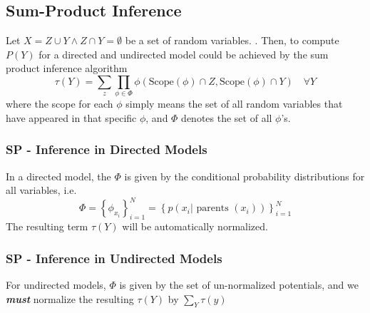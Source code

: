 \documentclass[11pt]{article}
\begin{document}
\subsection{Sum-Product Inference}
Let $X = Z \cup Y \wedge Z \cap Y = \emptyset$ be a set of random variables. . Then, to compute $P(Y)$ for a directed and undirected  model could be achieved by the sum product inference algorithm
\begin{equation*}
    \tau(Y)=\sum_{z}\prod_{\phi \in \Phi} \phi\left(\mathrm{Scope}(\phi) \cap Z, \mathrm{Scope}(\phi) \cap Y\right)\quad \forall Y
\end{equation*}
where the scope for each $\phi$ simply means the set of all random variables that have appeared in that specific $\phi$, and $\Phi$ denotes the set of all $\phi$'s.

\subsubsection{SP - Inference in  Directed Models}
In a directed model, the $\Phi$ is given by the conditional probability distributions for all variables, i.e.
\begin{equation*}
    \Phi=\left\{\phi_{x_{i}}\right\}_{i=1}^{N}=\left\{p\left(x_{i} | \text { parents }\left(x_{i}\right)\right)\right\}_{i=1}^{N}
\end{equation*}
The resulting term $\tau(Y)$ will be automatically normalized.

\subsubsection{SP - Inference in Undirected Models}
For undirected models, $\Phi$ is given by the set of un-normalized potentials, and we \textit{\textbf{must}} normalize the resulting $\tau(Y)$ by $\sum_Y \tau(y)$
\end{document}
